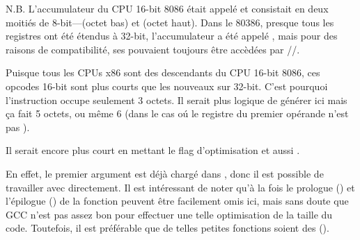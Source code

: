 N.B.  L'accumulateur du CPU 16-bit 8086 était appelé \AX et consistait en deux moitiés
de 8-bit---\AL (octet bas) et \AH (octet haut).
Dans le 80386, presque tous les registres ont été étendus à 32-bit, l'accumulateur
a été appelé \EAX, mais pour des raisons de compatibilité, ses 
pouvaient toujours être accèdées par \AX/\AH/\AL.

Puisque tous les CPUs x86 sont des descendants du CPU 16-bit 8086, ces 
opcodes 16-bit sont plus courts que les nouveaux sur 32-bit.
C'est pourquoi l'instruction  occupe seulement 3 octets.
Il serait plus logique de générer ici   mais ça fait 5 octets,
ou même 6 (dans le cas oú le registre du premier opérande n'est pas \EAX).


Il serait encore plus court en mettant le flag d'optimisation \Othree et aussi .




En effet, le premier argument est déjà chargé dans \EAX, donc il est possible de
travailler avec directement.
Il est intéressant de noter qu'à la fois le prologue ()
et l'épilogue () de la fonction peuvent être facilement omis ici, mais
sans doute que GCC n'est pas assez bon pour effectuer une telle optimisation de la
taille du code.
Toutefois, il est préférable que de telles petites fonctions soient des  ().
